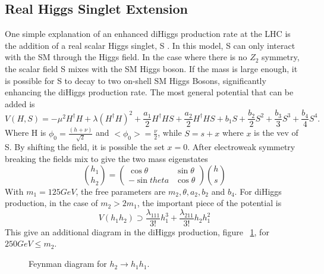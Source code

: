 \subsection{Real Higgs Singlet Extension}
One simple explanation of an enhanced diHiggs production rate at the LHC is the addition of a real scalar Higgs singlet, S \cite{Lewis:2017dme}. In this model, S can only interact with the SM through the Higgs field. In the case where there is no ${Z_{2}}$ symmetry, the scalar field S mixes with the SM Higgs boson. If the mass is large enough, it is possible for S to decay to two on-shell SM Higgs Bosons, significantly enhancing the diHiggs production rate.\linebreak
\indent The most general potential that can be added is 
\begin{equation}
V(H,S) = -\mu^{2}H^{\dagger}H + \lambda(H^{\dagger}H)^{2} + \frac{a_{1}}{2}H^{\dagger}HS + \frac{a_{2}}{2}H^{\dagger}HS + b_{1}S + \frac{b_{2}}{2}S^{2} + \frac{b_{3}}{3}S^{3} + \frac{b_{4}}{4}S^{4}.
\end{equation}
Where H is ${\phi_{0} = \frac{(h + \nu)}{\sqrt{2}}}$ and ${<\phi_{0}> = \frac{\nu}{2}}$, while ${S = s + x}$ where ${x}$ is the vev of S. By shifting the field, it is possible the set ${x = 0}$. After electroweak symmetry breaking the fields mix to give the two mass eigenstates
\begin{equation}
\binom{h_{1}}{h_{2}} = 
\begin{pmatrix}
\cos{\theta} & \sin{\theta}\\
-\sin{theta} & \cos{\theta}
\end{pmatrix}
\binom{h}{s}
\end{equation}
With ${m_{1} = 125 GeV}$, the free parameters are ${m_{2}, \theta,a_{2},b_{2}}$ and ${b_{4}}$. For diHiggs production, in the case of ${m_{2}>2m_{1}}$, the important piece of the potential is 
\begin{equation}
V(h_{1}h_{2}) \supset \frac{\lambda_{111}}{3!}h_{1}^{3} + \frac{\lambda_{211}}{3!}h_{2}h_{1}^{2}
\end{equation}
This give an additional diagram in the diHiggs production, figure ~\ref{fig:FeyRes}, for ${250 GeV \leq m_{2}}$.
\begin{figure}[h]
\begin{center}
\caption{Feynman diagram for ${h_{2}\rightarrow h_{1}h_{1}}$.}
\label{fig:FeyRes}
\end{center}
\end{figure}

